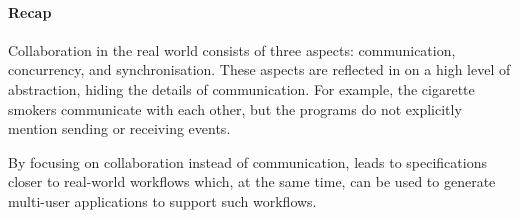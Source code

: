 \paragraph{Recap}

Collaboration in the real world consists of three aspects: communication, concurrency, and synchronisation.
These aspects are reflected in \TOP on a high level of abstraction, hiding the details of communication.
For example, the cigarette smokers communicate with each other, but the programs do not explicitly mention sending or receiving events.

By focusing on collaboration instead of communication, \TOP leads to specifications closer to real-world workflows which, at the same time, can be used to generate multi-user applications to support such workflows.
